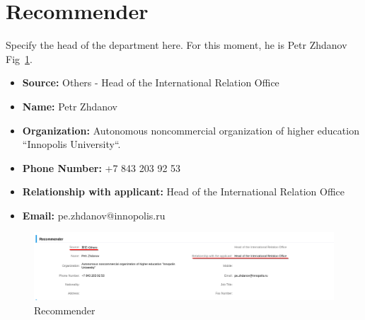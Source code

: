 \section{Recommender}
Specify the head of the department here.
For this moment, he is Petr Zhdanov Fig~\ref{fig:ru_recommender}.

\begin{itemize}
    \item \textbf{Source:} Others - Head of the International Relation Office
    \item \textbf{Name:} Petr Zhdanov
    \item \textbf{Organization:} Autonomous noncommercial organization of higher education ``Innopolis University``.
    \item \textbf{Phone Number:} +7 843 203 92 53
    \item \textbf{Relationship with applicant:} Head of the International Relation Office
    \item \textbf{Email:} pe.zhdanov@innopolis.ru
\end{itemize}


\begin{figure}[H]
    \centering
    \includegraphics[width=\textwidth]{russia/imgs/app_6_recommender}
    \caption{\centering Recommender}
    \label{fig:ru_recommender}
\end{figure}


\section{}


